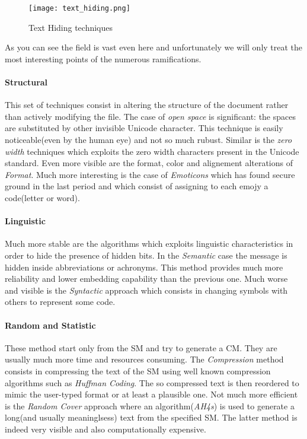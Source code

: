 \documentclass[../../main.tex]{subfiles}
\begin{document}
    \begin{figure}[h]
        \centering
        \caption{Text Hiding techniques}
        \texttt{[image: text\_hiding.png]}
    \end{figure}

    As you can see the field is vast even here and unfortunately we will only
    treat the most interesting points of the numerous ramifications.

    \paragraph{Structural}
    This set of techniques consist in altering the structure of the document
    rather than actively modifying the file. The case of \emph{open space} is
    significant: the spaces are substituted by other invisible Unicode
    character.
    This technique is easily noticeable(even by the human eye) and not so much
    rubust.
    Similar is the \emph{zero width} techniques which exploits the zero width
    characters present in the Unicode standard.
    Even more visible are the format, color and alignement alterations of
    \emph{Format}.
    Much more interesting is the case of \emph{Emoticons} which has found secure
    ground in the last period and which consist of assigning to each emojy a
    code(letter or word).

    \paragraph{Linguistic}
    Much more stable are the algorithms which exploits linguistic
    characteristics in order to hide the presence of hidden bits.
    In the \emph{Semantic} case the message is hidden inside abbreviations or
    achronyms.
    This method provides much more reliability and lower embedding capability
    than the previous one.
    Much worse and visible is the \emph{Syntactic} approach which consists in
    changing symbols with others to represent some code.

    \paragraph{Random and Statistic}
    These method start only from the SM and try to generate a CM.
    They are usually much more time and resources consuming.
    The \emph{Compression} method consists in compressing the text of the SM
    using well known compression algorithms such as \emph{Huffman Coding}.
    The so compressed text is then reordered to mimic the user-typed format or
    at least a plausible one.
    Not much more efficient is the \emph{Random Cover} approach where an
    algorithm(\emph{AH4s}) is used to generate a long(and usually meaninglsess)
    text from the specified SM.
    The latter method is indeed very visible and also computationally expensive.
\end{document}
